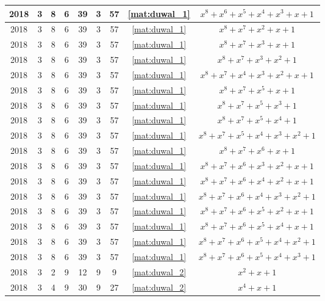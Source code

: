 \begin{longtable}{|c|c|c|c|c|c|c|c|c|}
2018 & 3 & 8 & 6 & 39 & 3 & 57 & \eqref{mat:duwal_1} & $x^8 + x^6 + x^5 + x^4 + x^3 + x + 1$ \\ \hline 
2018 & 3 & 8 & 6 & 39 & 3 & 57 & \eqref{mat:duwal_1} & $x^8 + x^7 + x^2 + x + 1$ \\ \hline 
2018 & 3 & 8 & 6 & 39 & 3 & 57 & \eqref{mat:duwal_1} & $x^8 + x^7 + x^3 + x + 1$ \\ \hline 
2018 & 3 & 8 & 6 & 39 & 3 & 57 & \eqref{mat:duwal_1} & $x^8 + x^7 + x^3 + x^2 + 1$ \\ \hline 
2018 & 3 & 8 & 6 & 39 & 3 & 57 & \eqref{mat:duwal_1} & $x^8 + x^7 + x^4 + x^3 + x^2 + x + 1$ \\ \hline 
2018 & 3 & 8 & 6 & 39 & 3 & 57 & \eqref{mat:duwal_1} & $x^8 + x^7 + x^5 + x + 1$ \\ \hline 
2018 & 3 & 8 & 6 & 39 & 3 & 57 & \eqref{mat:duwal_1} & $x^8 + x^7 + x^5 + x^3 + 1$ \\ \hline 
2018 & 3 & 8 & 6 & 39 & 3 & 57 & \eqref{mat:duwal_1} & $x^8 + x^7 + x^5 + x^4 + 1$ \\ \hline 
2018 & 3 & 8 & 6 & 39 & 3 & 57 & \eqref{mat:duwal_1} & $x^8 + x^7 + x^5 + x^4 + x^3 + x^2 + 1$ \\ \hline 
2018 & 3 & 8 & 6 & 39 & 3 & 57 & \eqref{mat:duwal_1} & $x^8 + x^7 + x^6 + x + 1$ \\ \hline 
2018 & 3 & 8 & 6 & 39 & 3 & 57 & \eqref{mat:duwal_1} & $x^8 + x^7 + x^6 + x^3 + x^2 + x + 1$ \\ \hline 
2018 & 3 & 8 & 6 & 39 & 3 & 57 & \eqref{mat:duwal_1} & $x^8 + x^7 + x^6 + x^4 + x^2 + x + 1$ \\ \hline 
2018 & 3 & 8 & 6 & 39 & 3 & 57 & \eqref{mat:duwal_1} & $x^8 + x^7 + x^6 + x^4 + x^3 + x^2 + 1$ \\ \hline 
2018 & 3 & 8 & 6 & 39 & 3 & 57 & \eqref{mat:duwal_1} & $x^8 + x^7 + x^6 + x^5 + x^2 + x + 1$ \\ \hline 
2018 & 3 & 8 & 6 & 39 & 3 & 57 & \eqref{mat:duwal_1} & $x^8 + x^7 + x^6 + x^5 + x^4 + x + 1$ \\ \hline 
2018 & 3 & 8 & 6 & 39 & 3 & 57 & \eqref{mat:duwal_1} & $x^8 + x^7 + x^6 + x^5 + x^4 + x^2 + 1$ \\ \hline 
2018 & 3 & 8 & 6 & 39 & 3 & 57 & \eqref{mat:duwal_1} & $x^8 + x^7 + x^6 + x^5 + x^4 + x^3 + 1$ \\ \hline 
2018 & 3 & 2 & 9 & 12 & 9 & 9 & \eqref{mat:duwal_2} & $x^2 + x + 1$ \\ \hline 
2018 & 3 & 4 & 9 & 30 & 9 & 27 & \eqref{mat:duwal_2} & $x^4 + x + 1$ \\ \hline 

\end{longtable}
